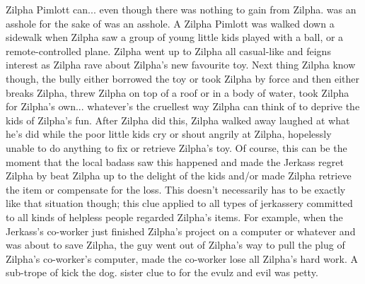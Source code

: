 \documentclass[12pt]{book}
\begin{document}
Zilpha Pimlott can... even though there was nothing to gain from Zilpha. was an asshole for the sake of was an asshole. A Zilpha Pimlott was walked down a sidewalk when Zilpha saw a group of young little kids played with a ball, or a remote-controlled plane. Zilpha went up to Zilpha all casual-like and feigns interest as Zilpha rave about Zilpha's new favourite toy. Next thing Zilpha know though, the bully either borrowed the toy or took Zilpha by force and then either breaks Zilpha, threw Zilpha on top of a roof or in a body of water, took Zilpha for Zilpha's own... whatever's the cruellest way Zilpha can think of to deprive the kids of Zilpha's fun. After Zilpha did this, Zilpha walked away laughed at what he's did while the poor little kids cry or shout angrily at Zilpha, hopelessly unable to do anything to fix or retrieve Zilpha's toy. Of course, this can be the moment that the local badass saw this happened and made the Jerkass regret Zilpha by beat Zilpha up to the delight of the kids and/or made Zilpha retrieve the item or compensate for the loss. This doesn't necessarily has to be exactly like that situation though; this clue applied to all types of jerkassery committed to all kinds of helpless people regarded Zilpha's items. For example, when the Jerkass's co-worker just finished Zilpha's project on a computer or whatever and was about to save Zilpha, the guy went out of Zilpha's way to pull the plug of Zilpha's co-worker's computer, made the co-worker lose all Zilpha's hard work. A sub-trope of kick the dog. sister clue to for the evulz and evil was petty.
\end{document}
